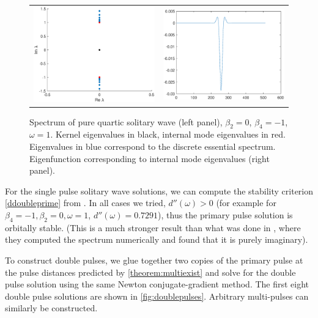 \documentclass[12pt]{article}
\begin{document}
\begin{figure}[H]
\centering
\begin{tabular}{cc}
\includegraphics[width=8cm]{images/PQSspec.eps} &
\includegraphics[width=8cm]{images/PQSinternalmode.eps}
\end{tabular}
\caption{Spectrum of pure quartic solitary wave (left panel), $\beta_2 = 0$, $\beta_4 = -1$, $\omega = 1$. Kernel eigenvalues in black, internal mode eigenvalues in red. Eigenvalues in blue correspond to the discrete essential spectrum. Eigenfunction corresponding to internal mode eigenvalues (right panel).}
\label{fig:PQSspec}
\end{figure} 

For the single pulse solitary wave solutions, we can compute the stability criterion \cref{ddoubleprime} from \cite{Grillakis1987}. In all cases we tried, $d''(\omega) > 0$ (for example for $\beta_4 = -1, \beta_2 = 0, \omega = 1$, $d''(\omega) = 0.7291$), thus the primary pulse solution is orbitally stable. (This is a much stronger result than what was done in \cite{Tam2019,Tam2020}, where they computed the spectrum numerically and found that it is purely imaginary). 

To construct double pulses, we glue together two copies of the primary pulse at the pulse distances predicted by \cref{theorem:multiexist} and solve for the double pulse solution using the same Newton conjugate-gradient method. The first eight double pulse solutions are shown in \cref{fig:doublepulses}. Arbitrary multi-pulses can similarly be constructed.
\end{document}
